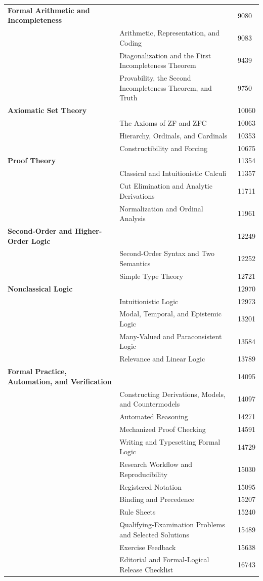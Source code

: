 \begin{longtable}{@{}p{2.1in}p{3.6in}p{0.6in}@{}}
\textbf{Formal Arithmetic and Incompleteness} &  & 9080 \\
 & Arithmetic, Representation, and Coding & 9083 \\
 & Diagonalization and the First Incompleteness Theorem & 9439 \\
 & Provability, the Second Incompleteness Theorem, and Truth & 9750 \\
\textbf{Axiomatic Set Theory} &  & 10060 \\
 & The Axioms of ZF and ZFC & 10063 \\
 & Hierarchy, Ordinals, and Cardinals & 10353 \\
 & Constructibility and Forcing & 10675 \\
\textbf{Proof Theory} &  & 11354 \\
 & Classical and Intuitionistic Calculi & 11357 \\
 & Cut Elimination and Analytic Derivations & 11711 \\
 & Normalization and Ordinal Analysis & 11961 \\
\textbf{Second-Order and Higher-Order Logic} &  & 12249 \\
 & Second-Order Syntax and Two Semantics & 12252 \\
 & Simple Type Theory & 12721 \\
\textbf{Nonclassical Logic} &  & 12970 \\
 & Intuitionistic Logic & 12973 \\
 & Modal, Temporal, and Epistemic Logic & 13201 \\
 & Many-Valued and Paraconsistent Logic & 13584 \\
 & Relevance and Linear Logic & 13789 \\
\textbf{Formal Practice, Automation, and Verification} &  & 14095 \\
 & Constructing Derivations, Models, and Countermodels & 14097 \\
 & Automated Reasoning & 14271 \\
 & Mechanized Proof Checking & 14591 \\
 & Writing and Typesetting Formal Logic & 14729 \\
 & Research Workflow and Reproducibility & 15030 \\
 & Registered Notation & 15095 \\
 & Binding and Precedence & 15207 \\
 & Rule Sheets & 15240 \\
 & Qualifying-Examination Problems and Selected Solutions & 15489 \\
 & Exercise Feedback & 15638 \\
 & Editorial and Formal-Logical Release Checklist & 16743 \\
\end{longtable}
\endgroup
